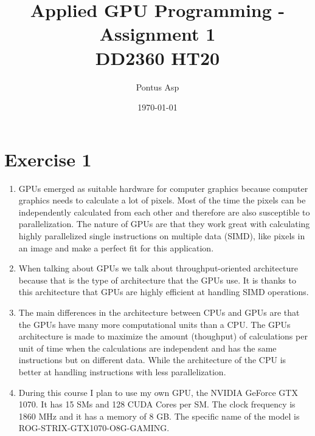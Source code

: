 \documentclass[a4paper, 12pt]{article}
\begin{document}
\title{\vspace{4.0cm}Applied GPU Programming - Assignment 1\\
\large DD2360 HT20}
\author{Pontus Asp}
\date{\today}
\maketitle
\thispagestyle{empty}
\newpage

\clearpage
{}

\section{Exercise 1}
\begin{enumerate}
	\item GPUs emerged as suitable hardware for computer graphics because computer graphics needs to calculate a lot of pixels. Most of the time the pixels can be independently calculated from each other and therefore are also susceptible to parallelization. The nature of GPUs are that they work great with calculating highly parallelized single instructions on multiple data (SIMD), like pixels in an image and make a perfect fit for this application.
	
	\item When talking about GPUs we talk about throughput-oriented architecture because that is the type of architecture that the GPUs use. It is thanks to this architecture that GPUs are highly efficient at handling SIMD operations.
	
	\item The main differences in the architecture between CPUs and GPUs are that the GPUs have many more computational units than a CPU. The GPUs architecture is made to maximize the amount (thoughput) of calculations per unit of time when the calculations are independent and has the same instructions but on different data. While the architecture of the CPU is better at handling instructions with less parallelization.
	
	\item During this course I plan to use my own GPU, the NVIDIA GeForce GTX 1070. It has 15 SMs and 128 CUDA Cores per SM. The clock frequency is 1860 MHz and it has a memory of 8 GB. The specific name of the model is ROG-STRIX-GTX1070-O8G-GAMING.	
	

\end{enumerate}
\end{document}
